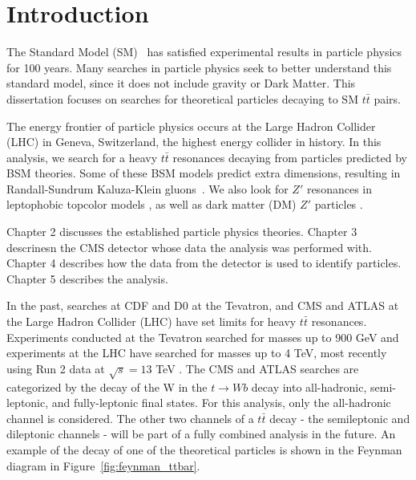 \chapter{Introduction}\label{chap:intro}


The Standard Model (SM)~\cite{pdg} has satisfied experimental results in particle physics for 100 years. Many searches in particle physics seek to better understand this standard model, since it does not include gravity or Dark Matter. This dissertation focuses on searches for theoretical particles decaying to SM $t\bar{t}$ pairs.


The energy frontier of particle physics occurs at the Large Hadron Collider (LHC) in Geneva, Switzerland, the highest energy collider in history.  In this analysis, we search for a heavy  $t\bar{t}$ resonances decaying from particles predicted by BSM theories. Some of these BSM models predict extra dimensions, resulting in Randall-Sundrum Kaluza-Klein gluons~\cite{rs1, ExtraDim}. We also look for $Z'$ resonances in leptophobic topcolor models \cite{leptophobicZprime, Zprimettxs, ZprimeCoupledtoGen3, WarpedGaugeBosons}, as well as dark matter (DM) $Z'$ particles \cite{wasmer_dark_matter}.

Chapter 2 discusses the established particle physics theories. Chapter 3 descrinesn the CMS detector whose data the analysis was performed with. Chapter 4 describes how the data from the detector is used to identify particles. Chapter 5 describes the analysis.


In the past, searches at CDF and D0 at the Tevatron, and CMS and ATLAS at the Large Hadron Collider (LHC) have set limits for heavy $t\bar{t}$ resonances. Experiments conducted at the Tevatron searched for masses up to 900 GeV \cite{cdftt3, d0tt} and experiments at the LHC have searched for masses up to 4 TeV, most recently using Run 2 data at $\sqrt{s} = 13$ TeV \cite{7tevZprime_CMSAllHad, 7tevZprime_CMSSemilept, 7tevZprime_ATLASAllHad, 7tevZprime_ATLASSemilept, 8tevZprime_CMSAllHad, 8tevZprime_CMSAllHadSemilept, 8tevZprime_CMSAllHadSemileptLept, 8tevZprime_ATLASSemilept, AN-2016-459}. The CMS and ATLAS searches are categorized by the decay of the W in the $t \rightarrow W b$ decay into all-hadronic, semi-leptonic, and fully-leptonic final states. For this analysis, only the all-hadronic channel is considered. The other two channels of a $t\bar{t}$ decay - the semileptonic and dileptonic channels - will be part of a fully combined analysis in the future. An example of the decay of one of the theoretical particles is shown in the Feynman diagram in Figure~\ref{fig:feynman_ttbar}.



